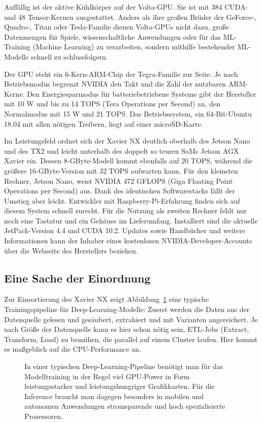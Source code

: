 Auffällig ist der aktive Kühlkörper auf der Volta-GPU. Sie ist mit 384 CUDA- und 48 Tensor-Kernen ausgestattet. Anders als ihre großen Brüder der GeForce-, Quadro-, Titan oder Tesla-Familie dienen Volta-­GPUs nicht dazu, große Datenmengen für Spiele, wissenschaftliche Anwendungen oder für das ML-Training (Machine Learning) zu verarbeiten, sondern mithilfe bestehender ML-Modelle schnell zu schlussfolgern. 

Der GPU steht ein 6-Kern-ARM-Chip der Tegra-Familie zur Seite. Je nach Betriebsmodus begrenzt NVIDIA den Takt und die Zahl der nutzbaren ARM-Kerne. Den Energiesparmodus für batteriebetriebene Systeme gibt der Hersteller mit 10 W und bis zu 14 TOPS (Tera Operations per Second) an, den Normalmodus mit 15 W und 21 TOPS. Das Betriebssystem, ein 64-Bit-Ubuntu 18.04 mit allen nötigen Treibern, liegt auf einer micro­SD-Karte. 

Im Leistungsfeld ordnet sich der ­Xavier NX deutlich oberhalb des Jetson Nano und des TX2 und leicht unterhalb des doppelt so teuren SoMs Jetson AGX Xavier ein. Dessen 8-GByte-Modell kommt ebenfalls auf 20 TOPS, während die größere 16-­GByte-Version mit 32 TOPS aufwarten kann. Für den kleinsten Rechner, Jetson Nano, weist NVIDIA 472 GFLOPS (Giga Floating Point Operations per Second) aus. Dank des identischen Software­stacks fällt der Umstieg aber leicht. Entwickler mit Raspberry-Pi-Erfahrung finden sich auf diesem System schnell zurecht. Für die Nutzung als zweiten Rechner fehlt nur noch eine Tastatur und ein Gehäuse im Lieferumfang. Installiert sind die aktuelle JetPack-Version 4.4 und CUDA 10.2. Updates sowie Handbücher und weitere Informationen kann der Inhaber eines kostenlosen NVIDIA-Deve­loper-­Accounts über die Webseite des Herstellers beziehen. 

\subsection{Eine Sache der Einordnung}

 
Zur Einsortierung des Xavier NX zeigt Abbildung~\ref{XavierNXPipeline} eine typische Trainingspipeline für Deep-Learning-Modelle: Zuerst werden die Daten aus der Datenquelle gelesen und gesäubert, extrahiert und mit Varianten angereichert. Je nach Größe der Datenquelle kann es hier schon nötig sein, ETL-Jobs (Extract, Transform, Load) zu bemühen, die parallel auf einem Cluster laufen. Hier kommt es maßgeblich auf die CPU-Performance an. 

\begin{figure}

 \caption{In einer typischen Deep-Learning-Pipeline benötigt man für das Modelltraining in der Regel viel GPU-Power in Form leistungsstarker und leistungshungriger Grafikkarten. Für die Inference braucht man dagegen besonders in mobilen und autonomen Anwendungen stromsparende und hoch spezialisierte Prozessoren.} \label{XavierNXPipeline}
 
\end{figure}


